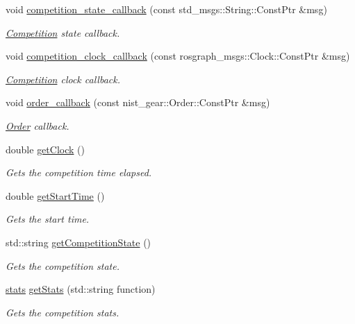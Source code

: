 \begin{DoxyCompactItemize}
void \hyperlink{classCompetition_a1b9545e863fc4574b29b1e43e80ebda3}{competition\+\_\+state\+\_\+callback} (const std\+\_\+msgs\+::\+String\+::\+Const\+Ptr \&msg)
\begin{DoxyCompactList}\small\item\em \hyperlink{classCompetition}{Competition} state callback. \end{DoxyCompactList}\item 
void \hyperlink{classCompetition_ae4695e5697587f7af4aa40ebae953534}{competition\+\_\+clock\+\_\+callback} (const rosgraph\+\_\+msgs\+::\+Clock\+::\+Const\+Ptr \&msg)
\begin{DoxyCompactList}\small\item\em \hyperlink{classCompetition}{Competition} clock callback. \end{DoxyCompactList}\item 
void \hyperlink{classCompetition_a6f51ab2e5a0da50fc53035f3ff6c9c31}{order\+\_\+callback} (const nist\+\_\+gear\+::\+Order\+::\+Const\+Ptr \&msg)
\begin{DoxyCompactList}\small\item\em \hyperlink{structOrder}{Order} callback. \end{DoxyCompactList}\item 
double \hyperlink{classCompetition_a4ea6b45be32e5b0e1f8e72fc053c4550}{get\+Clock} ()
\begin{DoxyCompactList}\small\item\em Gets the competition time elapsed. \end{DoxyCompactList}\item 
double \hyperlink{classCompetition_a9c8b79a8c4a7bcc5eaa77a327df3f98a}{get\+Start\+Time} ()
\begin{DoxyCompactList}\small\item\em Gets the start time. \end{DoxyCompactList}\item 
std\+::string \hyperlink{classCompetition_a3c553faa38b1bc1fa6efa049c8e23735}{get\+Competition\+State} ()
\begin{DoxyCompactList}\small\item\em Gets the competition state. \end{DoxyCompactList}\item 
\hyperlink{utils_8h_abd807f196b951c0cdd24d50164d54763}{stats} \hyperlink{classCompetition_acb4ec20a6365fbb922bd20fc3509ddf8}{get\+Stats} (std\+::string function)
\begin{DoxyCompactList}\small\item\em Gets the competition stats. \end{DoxyCompactList}\end{DoxyCompactItemize}
